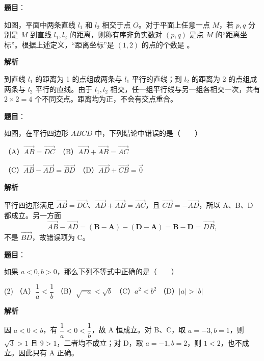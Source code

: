 \begin{answer}

\textbf{题目}：

如图，平面中两条直线 $l_1$ 和 $l_2$ 相交于点 $O$。对于平面上任意一点 $M$，若 $p,q$ 分别是 $M$ 到直线 $l_1,l_2$ 的距离，则称有序非负实数对 $(p,q)$ 是点 $M$ 的“距离坐标”。根据上述定义，“距离坐标”是 $(1,2)$ 的点的个数是 \gkblank{}。
\nopagebreak[4]
\begin{center}\end{center}
\nopagebreak[4]
\textbf{解析}

到直线 $l_1$ 的距离为 1 的点组成两条与 $l_1$ 平行的直线；到 $l_2$ 的距离为 2 的点组成两条与 $l_2$ 平行的直线。由于 $l_1,l_2$ 相交，任一组平行线与另一组各相交一次，共有 $2\times2=4$ 个不同交点。距离均为正，不会有交点重合。


\end{answer}
\begin{answer}

\textbf{题目}：

如图，在平行四边形 $ABCD$ 中，下列结论中错误的是\mbox{（　　）}

（A）$\overrightarrow{AB}=\overrightarrow{DC}$　（B）$\overrightarrow{AD}+\overrightarrow{AB}=\overrightarrow{AC}$

（C）$\overrightarrow{AB}-\overrightarrow{AD}=\overrightarrow{BD}$　（D）$\overrightarrow{AD}+\overrightarrow{CB}=\vec 0$
\nopagebreak[4]
\begin{center}\end{center}
\nopagebreak[4]
\textbf{解析}

平行四边形满足 $\overrightarrow{AB}=\overrightarrow{DC}$、$\overrightarrow{AD}+\overrightarrow{AB}=\overrightarrow{AC}$，且 $\overrightarrow{CB}=-\overrightarrow{AD}$，所以 A、B、D 都成立。另一方面
\nopagebreak[4]
\[
\overrightarrow{AB}-\overrightarrow{AD}
=(\mathbf B-\mathbf A)-(\mathbf D-\mathbf A)
=\mathbf B-\mathbf D=\overrightarrow{DB},
\]
不是 $\overrightarrow{BD}$，故错误项为 C。


\end{answer}
\begin{answer}

\textbf{题目}：

如果 $a<0,b>0$，那么下列不等式中正确的是\mbox{（　　）}

\begin{gkopts}(2)
\task （A）$\dfrac1a<\dfrac1b$
\task （B）$\sqrt{-a}<\sqrt b$
\task （C）$a^2<b^2$
\task （D）$|a|>|b|$
\end{gkopts}

\textbf{解析}

因 $a<0<b$，有 $\dfrac1a<0<\dfrac1b$，故 A 恒成立。对 B、C，取 $a=-3,b=1$，则 $\sqrt3>1$ 且 $9>1$，二者均不成立；对 D，取 $a=-1,b=2$，则 $1<2$，也不成立。因此只有 A 正确。


\end{answer}
